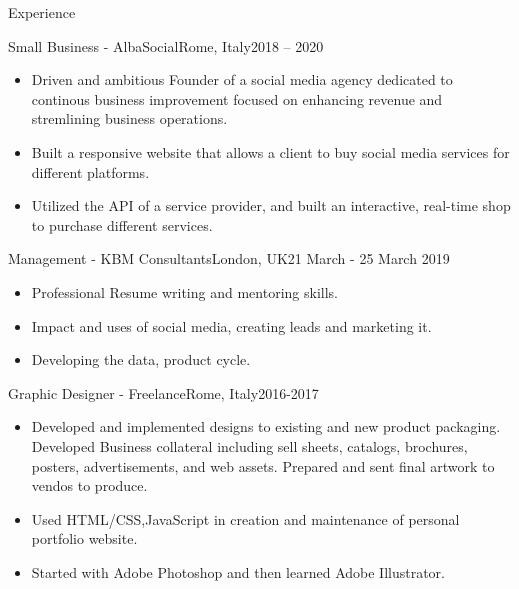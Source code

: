 \documentclass[]{mcdowellcv}
\begin{document}
	\begin{cvsection}{Experience}
		\begin{cvsubsection}{Small Business - AlbaSocial}{Rome, Italy}{2018 – 2020}
			\begin{itemize}
            \item Driven and ambitious Founder of a social media agency dedicated to continous business improvement focused on enhancing revenue and stremlining business operations.
            \item Built a responsive website that allows a client to buy social media services for different platforms.
            \item Utilized the API of a service provider, and built an interactive, real-time shop to purchase different services.
			\end{itemize}
		\end{cvsubsection}
		
		\begin{cvsubsection}{Management - KBM Consultants}{London, UK}{21 March - 25 March 2019}	
			\begin{itemize}
            	\item Professional Resume writing and mentoring skills.
				\item Impact and uses of social media, creating leads and marketing it.
                \item Developing the data, product cycle.
			\end{itemize}
		\end{cvsubsection}

		\begin{cvsubsection}{Graphic Designer - Freelance}{Rome, Italy}{2016-2017}
			\begin{itemize}
            	\item Developed and implemented designs to existing and new product packaging. Developed Business collateral including sell sheets, catalogs, brochures, posters, advertisements, and web assets. Prepared and sent final artwork to vendos to produce.
            	\item Used HTML/CSS,JavaScript in creation and maintenance of personal portfolio website.
            	\item Started with Adobe Photoshop and then learned Adobe Illustrator.
			\end{itemize}
		\end{cvsubsection}

	\end{cvsection}
\end{document}
